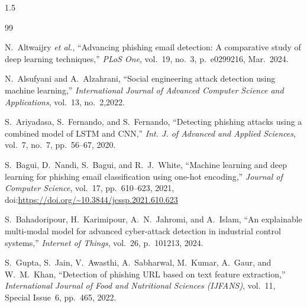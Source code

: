 \documentclass[a4paper, 14pt, oneside]{Thesis}
\begin{document}
{%
\listoffigures  %






\mainmatter	  %
\pagestyle{myheadings}  %

\begin{spacing}{1.5}


\begin{thebibliography}{99}

N.~Altwaijry \textit{et al.}, ``Advancing phishing email detection: A comparative study of deep learning techniques,'' \textit{PLoS One}, vol.~19, no.~3, p.~e0299216, Mar.~2024.

N.~Alsufyani and A.~Alzahrani, ``Social engineering attack detection using machine learning,'' \textit{International Journal of Advanced Computer Science and Applications}, vol.~13, no.~2,2022.

S.~Ariyadasa, S.~Fernando, and S.~Fernando, ``Detecting phishing attacks using a combined model of LSTM and CNN,'' \textit{Int. J. of Advanced and Applied Sciences}, vol.~7, no.~7, pp.~56--67, 2020.

S.~Bagui, D.~Nandi, S.~Bagui, and R.~J.~White, 
``Machine learning and deep learning for phishing email classification using one-hot encoding,'' 
\textit{Journal of Computer Science}, vol.~17, pp.~610--623, 2021, doi:\url{https://doi.org/~10.3844/jcssp.2021.610.623}

S.~Bahadoripour, H.~Karimipour, A.~N.~Jahromi, and A.~Islam, ``An explainable multi-modal model for advanced cyber-attack detection in industrial control systems,'' \textit{Internet of Things}, vol.~26, p.~101213, 2024.

S.~Gupta, S.~Jain, V.~Awasthi, A.~Sabharwal, M.~Kumar, A.~Gaur, and W.~M.~Khan, 
``Detection of phishing URL based on text feature extraction,'' 
\textit{International Journal of Food and Nutritional Sciences (IJFANS)}, 
vol.~11, Special Issue~6, pp.~465, 2022.


\end{thebibliography}
\end{spacing}}
\end{document}
